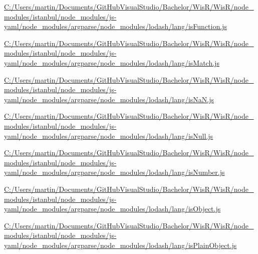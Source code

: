 \begin{DoxyCompactItemize}
\item 
\hyperlink{_c_1_2_users_2martin_2_documents_2_git_hub_visual_studio_2_bachelor_2_wis_r_2_wis_r_2node_module32d45eb27223e9fc5063647e6f1f4c77}{C\+:/\+Users/martin/\+Documents/\+Git\+Hub\+Visual\+Studio/\+Bachelor/\+Wis\+R/\+Wis\+R/node\+\_\+modules/istanbul/node\+\_\+modules/js-\/yaml/node\+\_\+modules/argparse/node\+\_\+modules/lodash/lang/is\+Function.\+js}
\item 
\hyperlink{_c_1_2_users_2martin_2_documents_2_git_hub_visual_studio_2_bachelor_2_wis_r_2_wis_r_2node_moduleebfce5748877c5ea3f07a11e39bbc28e}{C\+:/\+Users/martin/\+Documents/\+Git\+Hub\+Visual\+Studio/\+Bachelor/\+Wis\+R/\+Wis\+R/node\+\_\+modules/istanbul/node\+\_\+modules/js-\/yaml/node\+\_\+modules/argparse/node\+\_\+modules/lodash/lang/is\+Match.\+js}
\item 
\hyperlink{_c_1_2_users_2martin_2_documents_2_git_hub_visual_studio_2_bachelor_2_wis_r_2_wis_r_2node_module89fc8aa7b4534194f3e7c7c57d5f669b}{C\+:/\+Users/martin/\+Documents/\+Git\+Hub\+Visual\+Studio/\+Bachelor/\+Wis\+R/\+Wis\+R/node\+\_\+modules/istanbul/node\+\_\+modules/js-\/yaml/node\+\_\+modules/argparse/node\+\_\+modules/lodash/lang/is\+Na\+N.\+js}
\item 
\hyperlink{_c_1_2_users_2martin_2_documents_2_git_hub_visual_studio_2_bachelor_2_wis_r_2_wis_r_2node_modulea89b11259e594c041ce7ef87e5ed380a}{C\+:/\+Users/martin/\+Documents/\+Git\+Hub\+Visual\+Studio/\+Bachelor/\+Wis\+R/\+Wis\+R/node\+\_\+modules/istanbul/node\+\_\+modules/js-\/yaml/node\+\_\+modules/argparse/node\+\_\+modules/lodash/lang/is\+Null.\+js}
\item 
\hyperlink{_c_1_2_users_2martin_2_documents_2_git_hub_visual_studio_2_bachelor_2_wis_r_2_wis_r_2node_module15b222ebdd7d4f96c88a523ae7c9d8b2}{C\+:/\+Users/martin/\+Documents/\+Git\+Hub\+Visual\+Studio/\+Bachelor/\+Wis\+R/\+Wis\+R/node\+\_\+modules/istanbul/node\+\_\+modules/js-\/yaml/node\+\_\+modules/argparse/node\+\_\+modules/lodash/lang/is\+Number.\+js}
\item 
\hyperlink{_c_1_2_users_2martin_2_documents_2_git_hub_visual_studio_2_bachelor_2_wis_r_2_wis_r_2node_moduleda776dea75911ea38abaea641f7b6bce}{C\+:/\+Users/martin/\+Documents/\+Git\+Hub\+Visual\+Studio/\+Bachelor/\+Wis\+R/\+Wis\+R/node\+\_\+modules/istanbul/node\+\_\+modules/js-\/yaml/node\+\_\+modules/argparse/node\+\_\+modules/lodash/lang/is\+Object.\+js}
\item 
\hyperlink{_c_1_2_users_2martin_2_documents_2_git_hub_visual_studio_2_bachelor_2_wis_r_2_wis_r_2node_modulef645361585b08d156caf203d50c7e75d}{C\+:/\+Users/martin/\+Documents/\+Git\+Hub\+Visual\+Studio/\+Bachelor/\+Wis\+R/\+Wis\+R/node\+\_\+modules/istanbul/node\+\_\+modules/js-\/yaml/node\+\_\+modules/argparse/node\+\_\+modules/lodash/lang/is\+Plain\+Object.\+js}

\end{DoxyCompactItemize}
